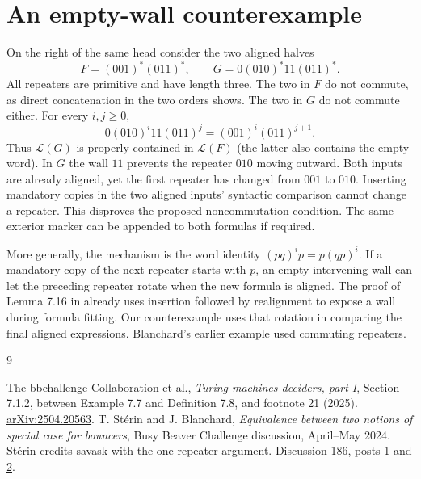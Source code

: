 \documentclass[11pt]{article}
\newcommand{\Lang}{\mathcal L}
\begin{document}
\section*{An empty-wall counterexample}
On the right of the same head consider the two aligned halves
\[
           F=(001)^*(011)^*,\qquad
           G=0(010)^*11(011)^* .
\]
All repeaters are primitive and have length three. The two in $F$ do not commute, as direct concatenation in the two orders shows. The two in $G$ do not commute either. For every $i,j\ge0$,
\[
       0(010)^i11(011)^j=(001)^i(011)^{j+1}.
\]
Thus $\Lang(G)$ is properly contained in $\Lang(F)$ (the latter also contains the empty word). In $G$ the wall $11$ prevents the repeater $010$ moving outward. Both inputs are already aligned, yet the first repeater has changed from $001$ to $010$. Inserting mandatory copies in the two aligned inputs' syntactic comparison cannot change a repeater. This disproves the proposed noncommutation condition. The same exterior marker can be appended to both formulas if required.

More generally, the mechanism is the word identity $(pq)^i p=p(qp)^i$. If a mandatory copy of the next repeater starts with $p$, an empty intervening wall can let the preceding repeater rotate when the new formula is aligned. The proof of Lemma 7.16 in \cite{paper} already uses insertion followed by realignment to expose a wall during formula fitting. Our counterexample uses that rotation in comparing the final aligned expressions. Blanchard's earlier example used commuting repeaters.

\begin{thebibliography}{9}\raggedright
{} The bbchallenge Collaboration et al., \emph{Turing machines deciders, part I}, Section 7.1.2, between Example 7.7 and Definition 7.8, and footnote 21 (2025). \href{https://arxiv.org/abs/2504.20563}{arXiv:2504.20563}.
 T. St\'erin and J. Blanchard, \emph{Equivalence between two notions of special case for bouncers}, Busy Beaver Challenge discussion, April--May 2024. St\'erin credits savask with the one-repeater argument. \href{https://discuss.bbchallenge.org/t/186}{Discussion 186, posts 1 and 2}.
\end{thebibliography}
\end{document}
